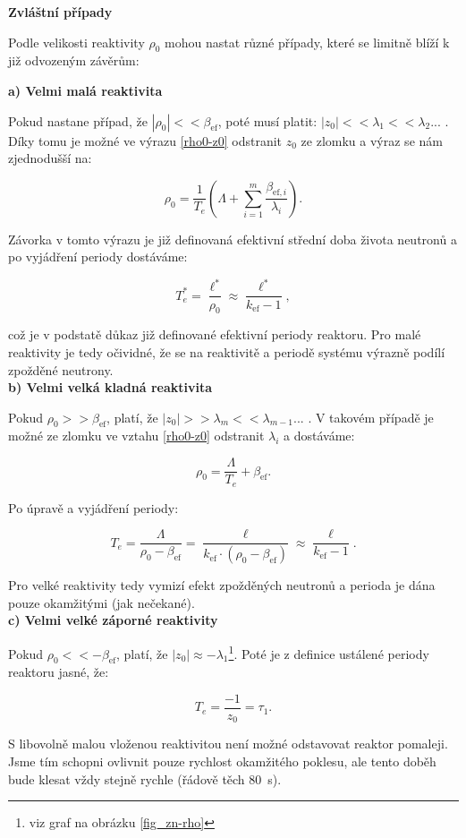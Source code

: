 \normalsize

\textbf{Zvláštní případy}

Podle velikosti reaktivity $\rho_0$ mohou nastat různé případy, které se limitně blíží k již odvozeným závěrům:

\textbf{a) Velmi malá reaktivita}

Pokud nastane případ, že $|\rho_0| << \beta_{\text{ef}}$, poté musí platit: $|z_0| << \lambda_1 << \lambda_2 ...$ . Díky tomu je možné ve výrazu \eqref{rho0-z0} odstranit $z_0$ ze zlomku a výraz se nám zjednodušší na:

$$ \rho_0 = \dfrac{1}{T_e} \left ( \Lambda + \sum_{i=1}^m \dfrac{\beta_{\text{ef},i}}{\lambda_i} \right ). $$

Závorka v tomto výrazu je již definovaná efektivní střední doba života neutronů a po vyjádření periody dostáváme:

$$ T_e^* = \dfrac{\ell^*}{\rho_0} \approx \dfrac{\ell^*}{k_{\text{ef}}-1}, $$

což je v podstatě důkaz již definované efektivní periody reaktoru. Pro malé reaktivity je tedy očividné, že se na reaktivitě a periodě systému výrazně podílí zpožděné neutrony.\\

\textbf{b) Velmi velká kladná reaktivita}

Pokud $\rho_0 >> \beta_{\text{ef}}$, platí, že $|z_0| >> \lambda_m << \lambda_{m-1} ...$ . V takovém případě je možné ze zlomku ve vztahu \eqref{rho0-z0} odstranit $\lambda_i$ a dostáváme:

$$ \rho_0 = \dfrac{\Lambda}{T_e} + \beta_{\text{ef}}. $$

Po úpravě a vyjádření periody:

$$ T_e = \dfrac{\Lambda}{\rho_0 - \beta_{\text{ef}}} = \dfrac{\ell}{k_{\text{ef}} \cdot (\rho_0 - \beta_{\text{ef}})} \approx \dfrac{\ell}{k_{\text{ef}}-1}. $$

Pro velké reaktivity tedy vymizí efekt zpožděných neutronů a perioda je dána pouze okamžitými (jak nečekané).\\

\textbf{c) Velmi velké záporné reaktivity}

Pokud $\rho_0 << -\beta_{\text{ef}}$, platí, že $|z_0| \approx -\lambda_1$\footnote{viz graf na obrázku \ref{fig_zn-rho}}. Poté je z definice ustálené periody reaktoru jasné, že:

$$ T_e = \dfrac{-1}{z_0} = \tau_1. $$

S libovolně malou vloženou reaktivitou není možné odstavovat reaktor pomaleji. Jsme tím schopni ovlivnit pouze rychlost okamžitého poklesu, ale tento doběh bude klesat vždy stejně rychle (řádově těch 80~s).\\


